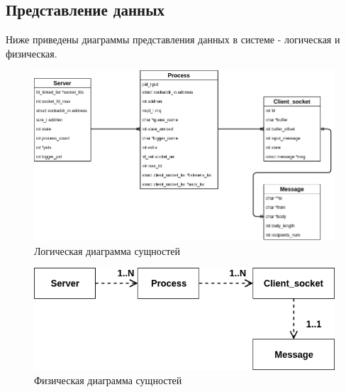 \documentclass[a4paper,12pt]{report}
\begin{document}
\subsection{Представление данных}
Ниже приведены диаграммы представления данных в системе - логическая и физическая.

\begin{figure}
\centering
\includegraphics[width=\textwidth]{static/Server_Class_Diagram.png}
\caption{Логическая диаграмма сущностей}
\label{fig:logic_diagram}
\end{figure}

\begin{figure}
\centering
\includegraphics[width=\textwidth]{static/Physical_data.png}
\caption{Физическая диаграмма сущностей}
\label{fig:phys_diagram}
\end{figure}
\end{document}
